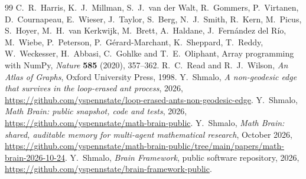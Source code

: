 \documentclass[11pt]{amsart}
\theoremstyle{remark}
\begin{document}
\begin{thebibliography}{99}
 C.~R.~Harris, K.~J.~Millman, S.~J.~van der Walt, R.~Gommers, P.~Virtanen, D.~Cournapeau,
E.~Wieser, J.~Taylor, S.~Berg, N.~J.~Smith, R.~Kern, M.~Picus, S.~Hoyer, M.~H.~van Kerkwijk, M.~Brett,
A.~Haldane, J.~Fern\'andez del R\'io, M.~Wiebe, P.~Peterson, P.~G\'erard-Marchant, K.~Sheppard, T.~Reddy,
W.~Weckesser, H.~Abbasi, C.~Gohlke and T.~E.~Oliphant, Array programming with NumPy,
\emph{Nature} \textbf{585} (2020), 357--362.
 R.~C.~Read and R.~J.~Wilson, \emph{An Atlas of Graphs}, Oxford University Press, 1998.
 Y.~Shmalo, \emph{A non-geodesic edge that survives in the loop-erased ant process}, 2026,
\url{https://github.com/yspennstate/loop-erased-ants-non-geodesic-edge}.
 Y.~Shmalo, \emph{Math Brain: public snapshot, code and tests}, 2026,
\url{https://github.com/yspennstate/math-brain-public}.
 Y.~Shmalo, \emph{Math Brain: shared, auditable memory for multi-agent mathematical research},
October 2026, \url{https://github.com/yspennstate/math-brain-public/tree/main/papers/math-brain-2026-10-24}.
 Y.~Shmalo, \emph{Brain Framework}, public software repository, 2026,
\url{https://github.com/yspennstate/brain-framework-public}.
\end{thebibliography}
\end{document}
